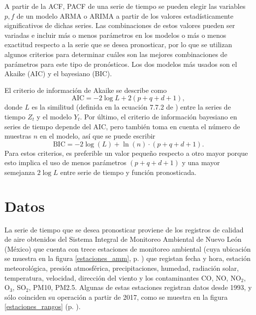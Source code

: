 \documentclass{elsarticle}
\begin{document}
A partir de la ACF, PACF de una serie de tiempo se pueden elegir las variables $p, f$ de un modelo ARMA o ARIMA a partir de los valores estadísticamente significativos de dichas series. Las combinaciones de estos valores pueden ser variadas e incluir más o menos parámetros en los modelos o más o menos exactitud respecto a la serie que se desea pronosticar, por lo que se utilizan algunos criterios para determinar cuáles son las mejores combinaciones de parámetros para este tipo de pronósticos. Los dos modelos más usados son el Akaike (AIC) y el bayesiano (BIC).

El criterio de información de Akaike se describe como
\begin{equation}
\mbox{AIC} = -2 \log{L} + 2 (p + q + d + 1),
\end{equation}
donde $L$ es la similitud (definida en la ecuación 7.7.2 de \cite{Hyndman2018}) entre la series de tiempo $Z_t$ y el modelo $Y_t$. Por último, el criterio de información bayesiano \cite{Albert2007} en series de tiempo depende del AIC, pero también toma en cuenta el número de muestras $n$ en el modelo, así que se puede escribir
\begin{equation}
    \mbox{BIC} = -2 \log(L) + \ln(n) \cdot (p + q + d + 1).
\end{equation}
Para estos criterios, es preferible un valor pequeño respecto a otro mayor porque esto implica el uso de menos parámetros $(p + q + d + 1)$ y una mayor semejanza $2\log{L}$ entre serie de tiempo y función pronosticada.

\section{Datos}
\label{datos}

La serie de tiempo que se desea pronosticar proviene de los registros de calidad de aire obtenidos del Sistema Integral de Monitoreo Ambiental de Nuevo León (México) \cite{aireNL} que cuenta con trece estaciones de monitoreo ambiental (cuya ubicación se muestra en la figura \ref{estaciones_amm}, p. \pageref{estaciones_amm}) que registan fecha y hora, estación meteorológica, presión atmosférica, precipitaciones, humedad, radiación solar, temperatura, velocidad, dirección del viento y los contaminantes CO, NO, NO$_2$, O$_3$, SO$_2$, PM10, PM2.5. Algunas de estas estaciones registran datos desde 1993, y sólo coinciden su operación a partir de 2017, como se muestra en la figura \ref{estaciones_rangos} (p. \pageref{estaciones_rangos}). 
\end{document}
